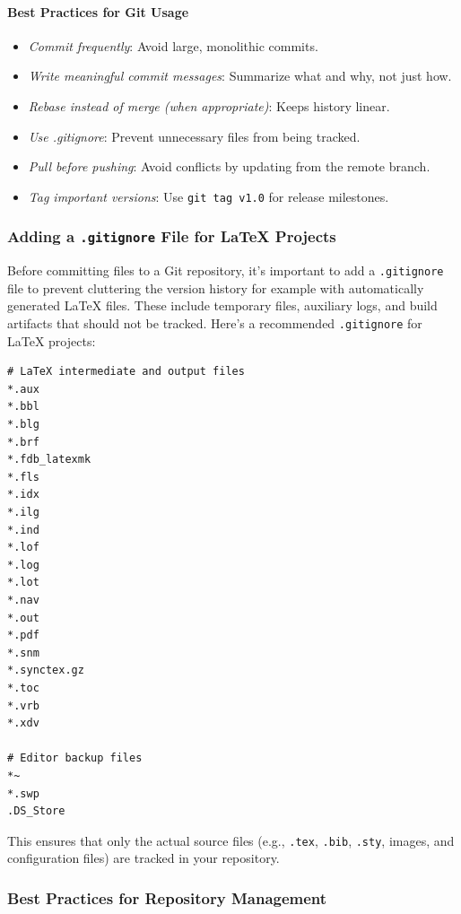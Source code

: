 \paragraph{Best Practices for Git Usage}
\begin{itemize}[itemsep=1pt,topsep=3pt]
    \item \emph{Commit frequently}: Avoid large, monolithic commits.
    \item \emph{Write meaningful commit messages}: Summarize what and why, not just how.
    \item \emph{Rebase instead of merge (when appropriate)}: Keeps history linear.
    \item \emph{Use .gitignore}: Prevent unnecessary files from being tracked.
    \item \emph{Pull before pushing}: Avoid conflicts by updating from the remote branch.
    \item \emph{Tag important versions}: Use \texttt{git tag v1.0} for release milestones.
\end{itemize}

\subsubsection{Adding a \texttt{.gitignore} File for LaTeX Projects}

Before committing files to a Git repository, it's important to add a \texttt{.gitignore} file to prevent cluttering the version history for example with automatically generated LaTeX files. These include temporary files, auxiliary logs, and build artifacts that should not be tracked. Here's a recommended \texttt{.gitignore} for LaTeX projects:
\begin{verbatim}
# LaTeX intermediate and output files
*.aux
*.bbl
*.blg
*.brf
*.fdb_latexmk
*.fls
*.idx
*.ilg
*.ind
*.lof
*.log
*.lot
*.nav
*.out
*.pdf
*.snm
*.synctex.gz
*.toc
*.vrb
*.xdv

# Editor backup files
*~
*.swp
.DS_Store
\end{verbatim}
This ensures that only the actual source files (e.g., \texttt{.tex}, \texttt{.bib}, \texttt{.sty}, images, and configuration files) are tracked in your repository.

\subsubsection{Best Practices for Repository Management}

